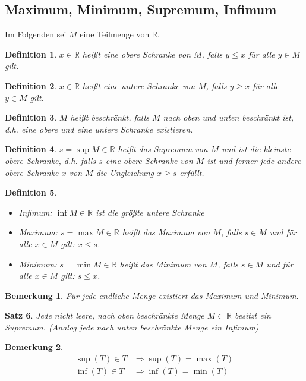\documentclass[12pt,a4paper]{report}%
\newtheorem{satz}{Satz}[section]
\newtheorem{definition}[satz]{Definition}
\newtheorem{bem}{Bemerkung}[section]
\numberwithin{equation}{section}
\newcommand{\R}{\mathbb{R}} %
\numberwithin{equation}{subsection}
\begin{document}
	\subsection{Maximum, Minimum, Supremum, Infimum}
	Im Folgenden sei $M$ eine Teilmenge von $\R$.
	\begin{definition}
	  $x \in \R$ heißt eine obere Schranke von $M$, falls $y \leq x$ für alle $y \in M$ gilt. 
	\end{definition}
	\begin{definition}
	  $x \in \R$ heißt eine untere Schranke von $M$, falls $y \geq x$ für alle $y \in M$ gilt. 
	\end{definition}
	\begin{definition}
	  $M$ heißt beschränkt, falls $M$ nach oben und unten beschränkt ist, d.h. eine obere und eine untere Schranke existieren.
	\end{definition}
	\begin{definition}
	  $s = \sup M \in \R$ heißt das Supremum von $M$ und ist die kleinste obere Schranke, d.h. falls $s$ eine obere Schranke von $M$ ist und ferner jede andere obere Schranke $x$ von $M$ die Ungleichung $x\geq s$ erfüllt.
	\end{definition}
	\begin{definition}$\;$\newline
    \vspace{-0.7cm}
	  \begin{itemize}
	    \item[] Infimum: $\inf M \in \R$ ist die größte untere Schranke
	    \item[] Maximum: $s = \max M \in \R$ heißt das Maximum von $M$, falls $s \in M$ und für alle $x \in M$ gilt: $x\leq s$.
	    \item[] Minimum: $s = \min M \in \R$ heißt das Minimum von $M$, falls $s \in M$ und für alle $x \in M$ gilt: $s \leq x$.
	  \end{itemize}
	\end{definition}
	\begin{bem}
	  Für jede endliche Menge existiert das Maximum und Minimum.
	\end{bem}
	\begin{satz}
	  Jede nicht leere, nach oben beschränkte Menge $M \subset \R$ besitzt ein Supremum. (Analog jede nach unten beschränkte Menge ein Infimum)
	\end{satz}
	\begin{bem}
	  \begin{align}
	    \sup(T) \in T &\Rightarrow \sup(T) = \max(T) \\
	    \inf(T) \in T &\Rightarrow \inf(T) = \min(T)
	  \end{align}
	\end{bem}
\end{document}
